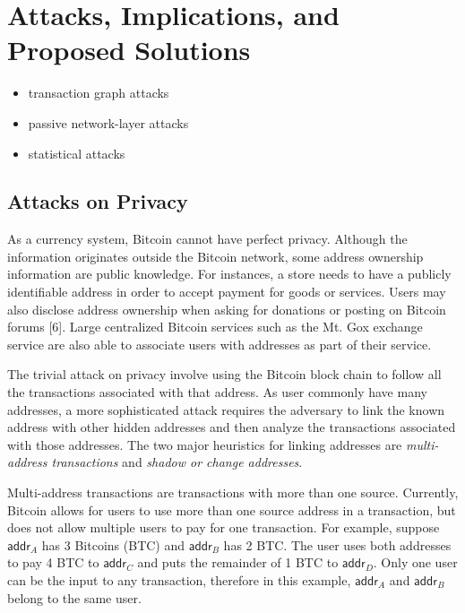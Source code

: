 \section{Attacks, Implications, and Proposed Solutions}
\begin{itemize}
	\item transaction graph attacks
	\item passive network-layer attacks
	\item statistical attacks
\end{itemize}


\subsection{Attacks on Privacy}
As a currency system, Bitcoin cannot have perfect privacy. Although the information originates outside the Bitcoin network, some address ownership information are public knowledge. For instances, a store needs to have a publicly identifiable address in order to accept payment for goods or services.  Users may also disclose address ownership when asking for donations or posting on Bitcoin forums [6]. Large centralized Bitcoin services such as the Mt. Gox exchange service are also able to associate users with addresses as part of their service.

The trivial attack on privacy involve using the Bitcoin block chain to follow all the transactions associated with that address. As user commonly have many addresses, a more sophisticated attack requires the adversary to link the known address with other hidden addresses and then analyze the transactions associated with those addresses. The two major heuristics for linking addresses are \emph{multi-address transactions} and \emph{shadow or change addresses}. 

Multi-address transactions are transactions with more than one source. Currently, Bitcoin allows for users to use more than one source address in a transaction, but does not allow multiple users to pay for one transaction. For example, suppose $\mathsf{addr}_A$ has 3 Bitcoins (BTC) and $\mathsf{addr}_B$ has 2 BTC. The user uses both addresses to pay 4 BTC to $\mathsf{addr}_C$ and puts the remainder of 1 BTC to $\mathsf{addr}_D$. Only one user can be the input to any transaction, therefore in this example, $\mathsf{addr}_A$ and $\mathsf{addr}_B$ belong to the same user.

